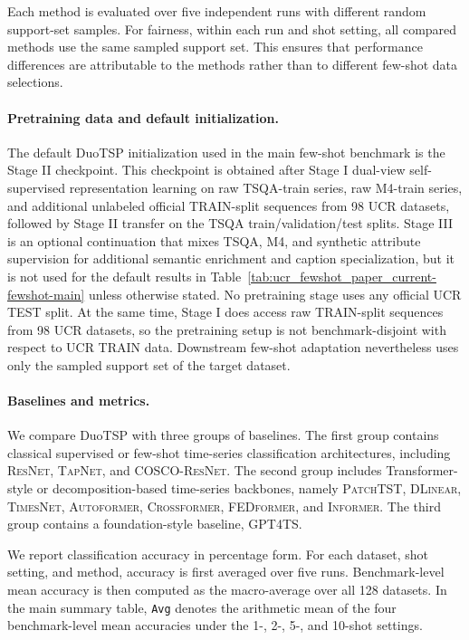 \documentclass{article}
\begin{document}
Each method is evaluated over five independent runs with different random support-set samples.
For fairness, within each run and shot setting, all compared methods use the same sampled support set.
This ensures that performance differences are attributable to the methods rather than to different few-shot data selections.

\paragraph{Pretraining data and default initialization.}
The default DuoTSP initialization used in the main few-shot benchmark is the Stage II checkpoint.
This checkpoint is obtained after Stage I dual-view self-supervised representation learning on raw TSQA-train series, raw M4-train series, and additional unlabeled official TRAIN-split sequences from 98 UCR datasets, followed by Stage II transfer on the TSQA train/validation/test splits.
Stage III is an optional continuation that mixes TSQA, M4, and synthetic attribute supervision for additional semantic enrichment and caption specialization, but it is not used for the default results in Table~\ref{tab:ucr_fewshot_paper_current-fewshot-main} unless otherwise stated.
No pretraining stage uses any official UCR TEST split.
At the same time, Stage I does access raw TRAIN-split sequences from 98 UCR datasets, so the pretraining setup is not benchmark-disjoint with respect to UCR TRAIN data.
Downstream few-shot adaptation nevertheless uses only the sampled support set of the target dataset.

\paragraph{Baselines and metrics.}
We compare DuoTSP with three groups of baselines.
The first group contains classical supervised or few-shot time-series classification architectures, including \textsc{ResNet}, \textsc{TapNet}, and \textsc{COSCO-ResNet}.
The second group includes Transformer-style or decomposition-based time-series backbones, namely \textsc{PatchTST}, \textsc{DLinear}, \textsc{TimesNet}, \textsc{Autoformer}, \textsc{Crossformer}, \textsc{FEDformer}, and \textsc{Informer}.
The third group contains a foundation-style baseline, \textsc{GPT4TS}.

We report classification accuracy in percentage form.
For each dataset, shot setting, and method, accuracy is first averaged over five runs.
Benchmark-level mean accuracy is then computed as the macro-average over all 128 datasets.
In the main summary table, \texttt{Avg} denotes the arithmetic mean of the four benchmark-level mean accuracies under the 1-, 2-, 5-, and 10-shot settings.
\end{document}
